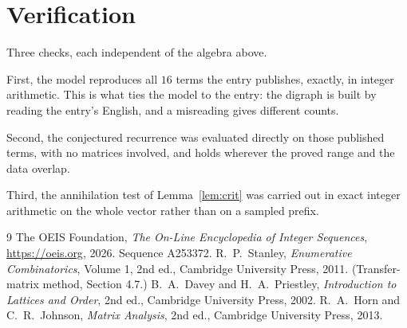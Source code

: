 \documentclass[11pt,a4paper]{article}
\theoremstyle{plain}
\theoremstyle{definition}
\begin{document}
\section{Verification}

Three checks, each independent of the algebra above.

First, the model reproduces all $16$ terms the entry publishes, exactly, in integer
arithmetic. This is what ties the model to the entry: the digraph is built by reading the
entry's English, and a misreading gives different counts.

Second, the conjectured recurrence was evaluated directly on those published terms, with no
matrices involved, and holds wherever the proved range and the data overlap.

Third, the annihilation test of Lemma~\ref{lem:crit} was carried out in exact integer
arithmetic on the whole vector rather than on a sampled prefix.

\begin{thebibliography}{9}
 The OEIS Foundation, \emph{The On-Line Encyclopedia of Integer
Sequences}, \url{https://oeis.org}, 2026. Sequence A253372.
 R.~P.~Stanley, \emph{Enumerative Combinatorics}, Volume 1, 2nd ed.,
Cambridge University Press, 2011. (Transfer-matrix method, Section 4.7.)
 B.~A.~Davey and H.~A.~Priestley, \emph{Introduction to Lattices and
Order}, 2nd ed., Cambridge University Press, 2002.
 R.~A.~Horn and C.~R.~Johnson, \emph{Matrix Analysis}, 2nd ed., Cambridge
University Press, 2013.
\end{thebibliography}
\end{document}
